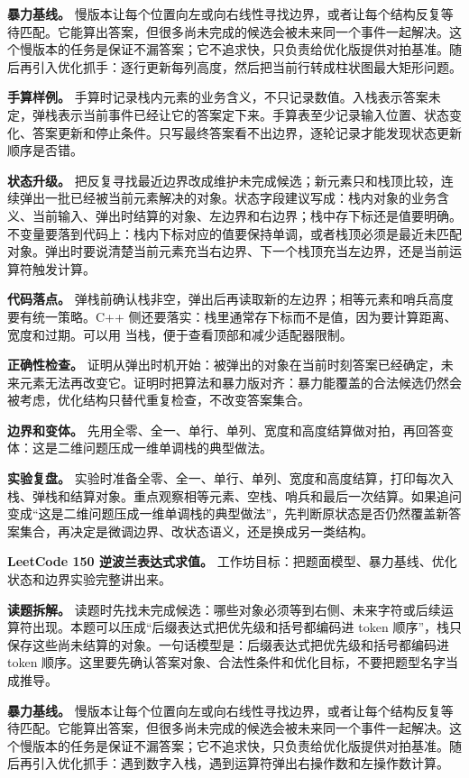 \textbf{暴力基线。} 慢版本让每个位置向左或向右线性寻找边界，或者让每个结构反复等待匹配。它能算出答案，但很多尚未完成的候选会被未来同一个事件一起解决。这个慢版本的任务是保证不漏答案；它不追求快，只负责给优化版提供对拍基准。随后再引入优化抓手：逐行更新每列高度，然后把当前行转成柱状图最大矩形问题。

\textbf{手算样例。} 手算时记录栈内元素的业务含义，不只记录数值。入栈表示答案未定，弹栈表示当前事件已经让它的答案定下来。手算表至少记录输入位置、状态变化、答案更新和停止条件。只写最终答案看不出边界，逐轮记录才能发现状态更新顺序是否错。

\textbf{状态升级。} 把反复寻找最近边界改成维护未完成候选；新元素只和栈顶比较，连续弹出一批已经被当前元素解决的对象。状态字段建议写成：栈内对象的业务含义、当前输入、弹出时结算的对象、左边界和右边界；栈中存下标还是值要明确。不变量要落到代码上：栈内下标对应的值要保持单调，或者栈顶必须是最近未匹配对象。弹出时要说清楚当前元素充当右边界、下一个栈顶充当左边界，还是当前运算符触发计算。

\textbf{代码落点。} 弹栈前确认栈非空，弹出后再读取新的左边界；相等元素和哨兵高度要有统一策略。C++ 侧还要落实：栈里通常存下标而不是值，因为要计算距离、宽度和过期。可以用  当栈，便于查看顶部和减少适配器限制。

\textbf{正确性检查。} 证明从弹出时机开始：被弹出的对象在当前时刻答案已经确定，未来元素无法再改变它。证明时把算法和暴力版对齐：暴力能覆盖的合法候选仍然会被考虑，优化结构只替代重复检查，不改变答案集合。

\textbf{边界和变体。} 先用全零、全一、单行、单列、宽度和高度结算做对拍，再回答变体：这是二维问题压成一维单调栈的典型做法。

\textbf{实验复盘。} 实验时准备全零、全一、单行、单列、宽度和高度结算，打印每次入栈、弹栈和结算对象。重点观察相等元素、空栈、哨兵和最后一次结算。如果追问变成“这是二维问题压成一维单调栈的典型做法”，先判断原状态是否仍然覆盖新答案集合，再决定是微调边界、改状态语义，还是换成另一类结构。

\noindent\textbf{LeetCode 150 逆波兰表达式求值。} 工作坊目标：把题面模型、暴力基线、优化状态和边界实验完整讲出来。

\textbf{读题拆解。} 读题时先找未完成候选：哪些对象必须等到右侧、未来字符或后续运算符出现。本题可以压成“后缀表达式把优先级和括号都编码进 token 顺序”，栈只保存这些尚未结算的对象。一句话模型是：后缀表达式把优先级和括号都编码进 token 顺序。这里要先确认答案对象、合法性条件和优化目标，不要把题型名字当成推导。

\textbf{暴力基线。} 慢版本让每个位置向左或向右线性寻找边界，或者让每个结构反复等待匹配。它能算出答案，但很多尚未完成的候选会被未来同一个事件一起解决。这个慢版本的任务是保证不漏答案；它不追求快，只负责给优化版提供对拍基准。随后再引入优化抓手：遇到数字入栈，遇到运算符弹出右操作数和左操作数计算。

